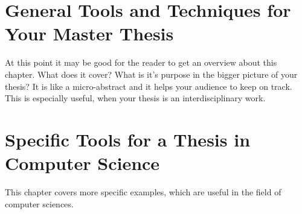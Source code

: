 \documentclass{article}
\begin{document}
\chapter{General Tools and Techniques for Your Master Thesis}

At this point it may be good for the reader to get an overview about this chapter. What does it cover? What is it's purpose in the bigger picture of your thesis? It is like a micro-abstract and it helps your audience to keep on track. This is especially useful, when your thesis is an interdisciplinary work.



\newpage




%
%

\chapter{Specific Tools for a Thesis in Computer Science}

This chapter covers more specific examples, which are useful in the field of computer sciences.

\newpage


%
%


\pagestyle{plain}




\end{document}
